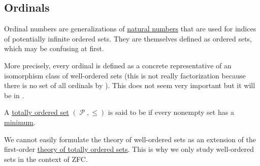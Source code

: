 \subsection{Ordinals}\label{subsec:ordinals}

\begin{remark}\label{rem:ordinal_is_equivalence_class}
  Ordinal numbers are generalizations of \hyperref[def:natural_numbers]{natural numbers} that are used for indices of potentially infinite ordered sets. They are themselves defined as ordered sets, which may be confusing at first.

  More precisely, every ordinal is defined as a concrete representative of an isomorphism class of well-ordered sets (this is not really factorization because there is no set of all ordinals by ). This does not seem very important but it will be in .
\end{remark}

\begin{definition}\label{def:well_ordered_set}
  A \hyperref[def:totally_ordered_set]{totally ordered set} \( (\mscrP, \leq) \) is said to be  if every nonempty set has a \hyperref[def:poset_extremal_points/maximum_and_minimum]{minimum}.

  We cannot easily formulate the theory of well-ordered sets as an extension of the first-order \hyperref[def:totally_ordered_set]{theory of totally ordered sets}. This is why we only study well-ordered sets in the context of ZFC.
\end{definition}

